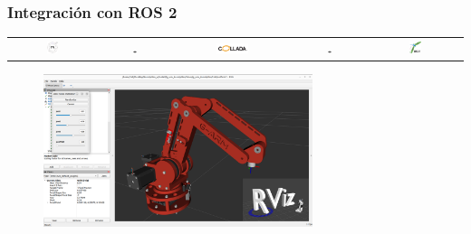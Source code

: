 \documentclass{beamer}
\begin{document}
\begin{frame}
\frametitle{Integración con ROS 2}
\begin{table}[htbp]
  \centering
  \begin{tabular}{ccccc}
      \includegraphics[width=0.15\textwidth, valign=m]{figs/STL.jpg} & \includegraphics[width=0.05\textwidth, valign=m]{figs/plus.png} & \includegraphics[width=0.3\textwidth, valign=m]{figs/collada.png} 
       & \includegraphics[width=0.05\textwidth, valign=m]{figs/plus.png} & \includegraphics[width=0.15\textwidth, valign=m]{figs/urdf.png} \\
      
  \end{tabular}
\end{table} 
\begin{figure}[h]
  
\centering
\includegraphics[width=0.7\textwidth]{figs/rviz.png}
\end{figure}  
\end{frame}
\end{document}
